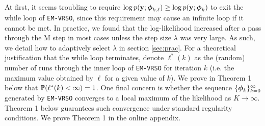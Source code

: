 At first, it seems troubling to require $\log p(\mathbf{y};\boldsymbol{\phi}_{k,\ell}) \geq \log p(\mathbf{y};\boldsymbol{\phi}_{k})$ to exit the while loop of \texttt{EM-VRSO}, since this requirement may cause an infinite loop if it cannot be met. In practice, we found that the log-likelihood increased after a pass through the M step in most cases unless the step size $\lambda$ was very large. As such, we detail how to adaptively select $\lambda$ in section \ref{sec:prac}. For a theoretical justification that the while loop terminates, denote $\ell^*(k)$ as the (random) number of runs through the inner loop of \texttt{EM-VRSO} for iteration $k$ (i.e. the maximum value obtained by $\ell$ for a given value of $k$). We prove in Theorem 1 below that $\mathbb{P}(\ell^*(k) < \infty) = 1$. One final concern is whether the sequence $\{\boldsymbol{\phi}_{k}\}_{k=0}^\infty$ generated by \texttt{EM-VRSO} converges to a local maximum of the likelihood as $K \to \infty$. Theorem 1 below guarantees such convergence under standard regularity conditions. We prove Theorem 1 in the online appendix.
    
